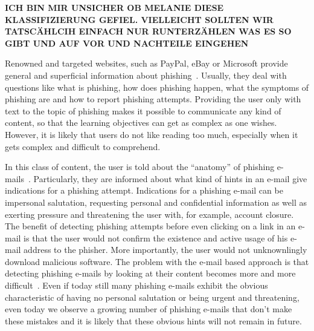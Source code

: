 \textbf{ICH BIN MIR UNSICHER OB MELANIE DIESE KLASSIFIZIERUNG GEFIEL.
 VIELLEICHT SOLLTEN WIR TATSCÄHLCIH EINFACH NUR RUNTERZÄHLEN WAS ES SO GIBT UND AUF VOR UND NACHTEILE EINGEHEN}
\begin{description}[leftmargin=0cm]
	\item[General Knowledge Transfer] Renowned and targeted websites, such as PayPal, eBay or Microsoft provide general and superficial information about phishing~\cite{generalknowledgemicrosoft, generalknowledgepaypal, generalknowledgeebay}.
	Usually, they deal with questions like what is phishing, how does phishing happen, what the symptoms of phishing are and how to report phishing attempts.
 Providing the user only with text to the topic of phishing makes it possible to communicate any kind of content, so that the learning objectives can get as complex as one wishes.
 However, it is likely that users do not like reading too much, especially when it gets complex and difficult to comprehend.

	\item[E-Mail Based Knowledge] In this class of content, the user is told about the ``anatomy'' of phishing e-mails~\cite{antiphishingphyllis, sonicwall}. Particularly, they are informed about what kind of hints in an e-mail give indications for a phishing attempt.
 Indications for a phishing e-mail can be impersonal salutation, requesting personal and confidential information as well as exerting pressure and threatening the user with, for example, account closure.
 The benefit of detecting phishing attempts before even clicking on a link in an e-mail is that the user would not confirm the existence and active usage of his e-mail address to the phisher.
 More importantly, the user would not unknownlingly download malicious software.
 The problem with the e-mail based approach is that detecting phishing e-mails by looking at their content becomes more and more difficult~\cite{microsoftphishing,spamfighter}. Even if today still many phishing e-mails exhibit the obvious characteristic of having no personal salutation or being urgent and threatening, even today we observe a growing number of phishing e-mails that don't make these mistakes and it is likely that these obvious hints will not remain in future.


\end{description}
